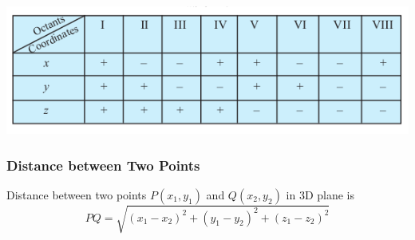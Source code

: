 \documentclass[12pt]{article}
\begin{document}
\begin{center}
    \includegraphics*[scale=0.7]{2.png}
\end{center}
\subsubsection*{Distance between Two Points}
Distance between two points $P(x_1,y_1)$ and $Q(x_2,y_2)$ in 3D plane is  
$$PQ=\sqrt{(x_1-x_2)^2+(y_1-y_2)^2+(z_1-z_2)^2}$$
\end{document}
